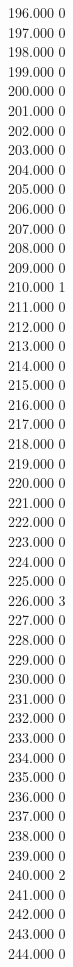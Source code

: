{ 196.000	0 \\
 197.000	0 \\
 198.000	0 \\
 199.000	0 \\
 200.000	0 \\
 201.000	0 \\
 202.000	0 \\
 203.000	0 \\
 204.000	0 \\
 205.000	0 \\
 206.000	0 \\
 207.000	0 \\
 208.000	0 \\
 209.000	0 \\
 210.000	1 \\
 211.000	0 \\
 212.000	0 \\
 213.000	0 \\
 214.000	0 \\
 215.000	0 \\
 216.000	0 \\
 217.000	0 \\
 218.000	0 \\
 219.000	0 \\
 220.000	0 \\
 221.000	0 \\
 222.000	0 \\
 223.000	0 \\
 224.000	0 \\
 225.000	0 \\
 226.000	3 \\
 227.000	0 \\
 228.000	0 \\
 229.000	0 \\
 230.000	0 \\
 231.000	0 \\
 232.000	0 \\
 233.000	0 \\
 234.000	0 \\
 235.000	0 \\
 236.000	0 \\
 237.000	0 \\
 238.000	0 \\
 239.000	0 \\
 240.000	2 \\
 241.000	0 \\
 242.000	0 \\
 243.000	0 \\
 244.000	0 \\
}
